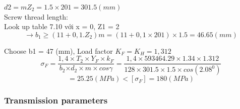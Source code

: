 $d2 = mZ_2 = 1.5\times201 = 301.5 (mm)$\\
	Screw thread length:\\
Look up table 7.10 với x = 0, Z1 = 2 
$$\rightarrow b_1\geq\left(11+0,1.Z_2\right)m=\left(11+0,1\times201\right)\times1.5=46.65\left(mm\right)$$
	
Choose b1 = 47 (mm),
	Load factor $K_F=K_H = 1,312$
$$\sigma_F=\frac{1,4\times T_2\times Y_F\times k_F}{b_2{\times d}_2\times m\times c o s\gamma}=\frac{1,4\times593464.29\times1.34\times1.312}{128\times301.5\times1.5\times c o s{\left({2.08}^0\right)}}$$
$$=25.25\left(MPa\right)<   [\sigma_F]=180\left(MPa\right)
$$

\subsubsection{Transmission parameters}
